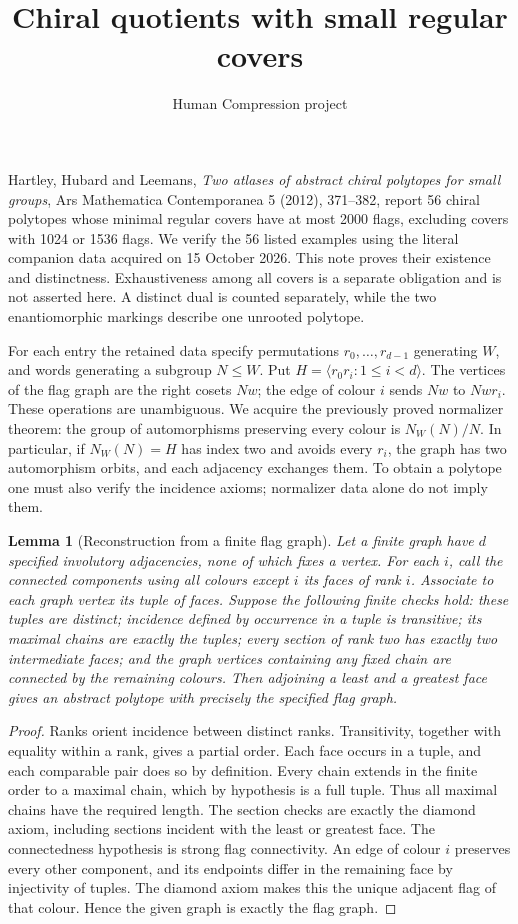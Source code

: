 \documentclass[11pt,a4paper]{article}
\title{Chiral quotients with small regular covers}
\author{Human Compression project}\date{}
\newtheorem{lemma}{Lemma}\newtheorem{theorem}{Theorem}
\begin{document}
\maketitle
Hartley, Hubard and Leemans, \emph{Two atlases of abstract chiral
polytopes for small groups}, Ars Mathematica Contemporanea 5 (2012), 371--382, report
56 chiral polytopes whose minimal regular covers have at most 2000 flags,
excluding covers with 1024 or 1536 flags. We verify the 56 listed examples
using the literal companion data acquired on 15 October 2026. This note
proves their existence and distinctness. Exhaustiveness among all covers
is a separate obligation and is not asserted here. A distinct dual is
counted separately, while the two enantiomorphic markings describe one
unrooted polytope.

For each entry the retained data specify permutations
$r_0,\ldots,r_{d-1}$ generating $W$, and words generating a subgroup
$N\leq W$. Put $H=\langle r_0r_i:1\leq i<d\rangle$.
The vertices of the flag graph are the right cosets $Nw$; the edge of
colour $i$ sends $Nw$ to $Nwr_i$. These operations are unambiguous.
We acquire the previously proved normalizer theorem: the group of
automorphisms preserving every colour is $N_W(N)/N$. In particular,
if $N_W(N)=H$ has index two and avoids every $r_i$, the graph has two
automorphism orbits, and each adjacency exchanges them. To obtain a
polytope one must also verify the incidence axioms; normalizer data
alone do not imply them.

\begin{lemma}[Reconstruction from a finite flag graph]
Let a finite graph have $d$ specified involutory adjacencies, none of
which fixes a vertex. For each
$i$, call the connected components using all colours except $i$ its
faces of rank $i$. Associate to each graph vertex its tuple of faces.
Suppose the following finite checks hold: these tuples are distinct;
incidence defined by occurrence in a tuple is transitive; its maximal
chains are exactly the tuples; every section of rank two has exactly
two intermediate faces; and the graph vertices containing any fixed
chain are connected by the remaining colours. Then adjoining a least
and a greatest face gives an abstract polytope with precisely the
specified flag graph.
\end{lemma}
\begin{proof}
Ranks orient incidence between distinct ranks. Transitivity, together
with equality within a rank, gives a partial order. Each face occurs
in a tuple, and each comparable pair does so by definition. Every chain
extends in the finite order to a maximal chain, which by hypothesis is
a full tuple. Thus all maximal chains have the required length.
The section checks are exactly the diamond axiom, including sections
incident with the least or greatest face. The connectedness hypothesis
is strong flag connectivity. An edge of colour $i$ preserves every
other component, and its endpoints differ in the remaining face by
injectivity of tuples. The diamond axiom makes this the unique adjacent
flag of that colour. Hence the given graph is exactly the flag graph.
\end{proof}
\end{document}
